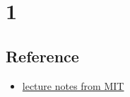 \chapter{1}

\section{Reference}
\begin{itemize}
    \item \href{https://ocw.mit.edu/courses/15-084j-nonlinear-programming-spring-2004/ac15ee761a195e0fa56df107942f6373_lec18_duality_thy.pdf}{lecture notes from MIT}
\end{itemize}